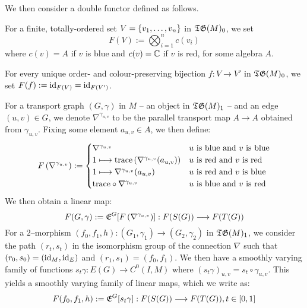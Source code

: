 \documentclass[./Thick_TQFTs_and_Quantum_Information.tex]{subfiles}
\begin{document}
We then consider a double functor defined as follows.

\begin{defn}
For a finite, totally-ordered set $V = \set{v_1, \dots, v_n}$ in $\mathfrak{TG}(M)_0$, we
set
\[
  F(V) := \bigotimes_{i = 1}^{n} c(v_i)
\]
where $c(v) = A$ if $v$ is blue and $c(v) = \mathbb{C}$ if $v$ is red,
for some algebra $A$.

For every unique order- and colour-preserving bijection $f : V \to V'$ in
$\mathfrak{TG}(M)_0$, we set $F(f) := \text{id}_{F(V)} = \text{id}_{F(V')}$.

For a transport graph $(G, \gamma)$ in $M$ -- an object in $\mathfrak{TG}(M)_1$ -- and an
edge $(u, v) \in G$, we denote $\nabla^{\gamma_{u, v}}$ to be the parallel
transport map $A \to A$ obtained from $\gamma_{u, v}$. Fixing some element
$a_{u, v} \in A$, we then define:
\[
  F\left( \nabla^{\gamma_{u, v}} \right) := \begin{cases}
    \nabla^{\gamma_{u, v}}
      & u \text{ is blue and } v \text{ is blue} \\
    1 \longmapsto \text{trace}\left( \nabla^{\gamma_{u, v}}(a_{u, v}) \right)
      & u \text{ is red and } v \text{ is red} \\
    1 \longmapsto \nabla^{\gamma_{u, v}}(a_{u, v})
      & u \text{ is red and } v \text{ is blue} \\
    \text{trace} \circ \nabla^{\gamma_{u, v}}
      & u \text{ is blue and } v \text{ is red}
  \end{cases}
\]
We then obtain a linear map:
\[
  F(G, \gamma) := \mathfrak{E}^{G}[F\left( \nabla^{\gamma_{u, v}} \right)]
    : F(S(G)) \stackrel{}{\longrightarrow} F(T(G))
\]
For a $2$--morphism
$(f_0, f_1, h) : (G_1, \gamma_1) \to (G_2, \gamma_2)$ in $\mathfrak{TG}(M)_1$, we consider
the path $(r_t, s_t)$ in the isomorphism group of the connection $\nabla$ such
that $(r_0, s_0) = (\text{id}_M, \text{id}_E)$ and $(r_1, s_1) = (f_0, f_1)$. We then have a
smoothly varying family of functions $s_t\gamma : E(G) \to C^0(I, M)$
where $(s_t\gamma)_{u, v} = s_t \circ \gamma_{u, v}$. This yields a smoothly
varying family of linear maps, which we write as:
\[
  F(f_0, f_1, h) := \mathfrak{E}^{G}[s_t\gamma]
    : F(S(G)) \stackrel{}{\longrightarrow} F(T(G)), t \in [0, 1]
\]
\end{defn}


\end{document}
